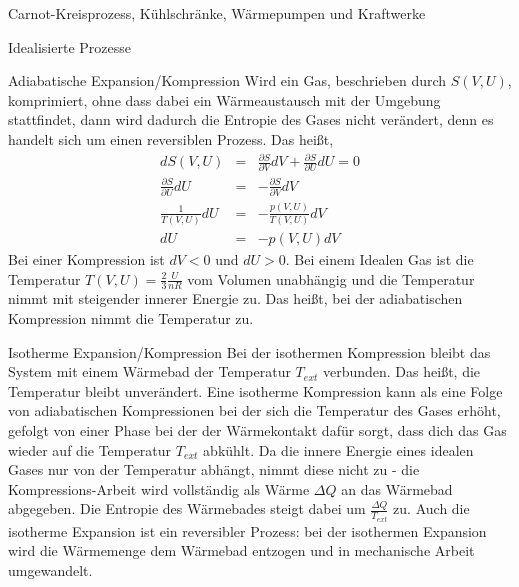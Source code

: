 \begin{chapter}{\titlestr}
\begin{section}{Carnot-Kreisprozess, Kühlschränke, Wärmepumpen und Kraftwerke}
\begin{subsection}{Idealisierte Prozesse}
\begin{subsubsection}{Adiabatische Expansion/Kompression}
Wird ein Gas, beschrieben durch $S(V,U)$, komprimiert, ohne dass dabei ein Wärmeaustausch mit der Umgebung stattfindet, dann wird dadurch
die Entropie des Gases nicht verändert, denn es handelt sich um einen reversiblen Prozess. Das heißt,
\begin{eqnarray*}
dS(V,U) &=& \frac{\partial S}{\partial V}dV+\frac{\partial S}{\partial U}dU = 0\\
\frac{\partial S}{\partial U}dU &=& -\frac{\partial S}{\partial V}dV\\
\frac{1}{T(V,U)}dU &=& -\frac{p(V,U)}{T(V,U)}dV\\
dU &=& -p(V,U)dV
\end{eqnarray*}
Bei einer Kompression ist $dV<0$ und $dU>0$. Bei einem Idealen Gas ist die Temperatur $T(V,U)=\frac{2}{3}\frac{U}{nR}$ vom Volumen unabhängig und die Temperatur nimmt mit steigender innerer Energie zu. Das heißt, bei der adiabatischen Kompression nimmt die Temperatur zu.
\end{subsubsection}

\begin{subsubsection}{Isotherme Expansion/Kompression}
Bei der isothermen Kompression bleibt das System mit einem Wärmebad der Temperatur $T_{ext}$ verbunden. Das heißt, die Temperatur bleibt unverändert.
Eine isotherme Kompression kann als eine Folge von adiabatischen Kompressionen bei der sich die Temperatur des Gases erhöht, gefolgt von einer Phase bei der der Wärmekontakt dafür sorgt, dass dich das Gas wieder auf die Temperatur $T_{ext}$ abkühlt. Da die innere Energie eines idealen Gases nur von der Temperatur abhängt,
nimmt diese nicht zu - die Kompressions-Arbeit wird vollständig als Wärme $\Delta Q$ an das Wärmebad abgegeben. Die Entropie des Wärmebades steigt dabei um $\frac{\Delta Q}{T_{ext}}$ zu. Auch die isotherme Expansion ist ein reversibler Prozess: bei der isothermen Expansion wird die Wärmemenge dem Wärmebad entzogen und in mechanische Arbeit umgewandelt.
\end{subsubsection}
\end{subsection}


\end{section}
\end{chapter}
